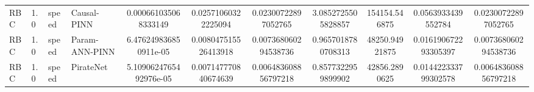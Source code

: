 \begin{landscape}
\begin{longtable}{llllccccccc}
 RBC &    1.0 & speed &    Causal-PINN &   0.000661035068333149 &    0.02571060322225094 &    0.02300722897052765 &   3.0852725505828857 &         154154.546875 &    0.0563933439552784 &    0.02300722897052765 \\
 RBC &    1.0 & speed & Param-ANN-PINN &  6.476249836850911e-05 &   0.008047515526413918 &   0.007368060294538736 &   0.9657018780708313 &        48250.94921875 &  0.016190672293305397 &   0.007368060294538736 \\
 RBC &    1.0 & speed &      PirateNet & 5.1090624765492976e-05 &   0.007147770840674639 &   0.006483608856797218 &   0.8577322959899902 &         42856.2890625 &  0.014422333799302578 &   0.006483608856797218 \\
\end{longtable}

\normalsize
\end{landscape}
